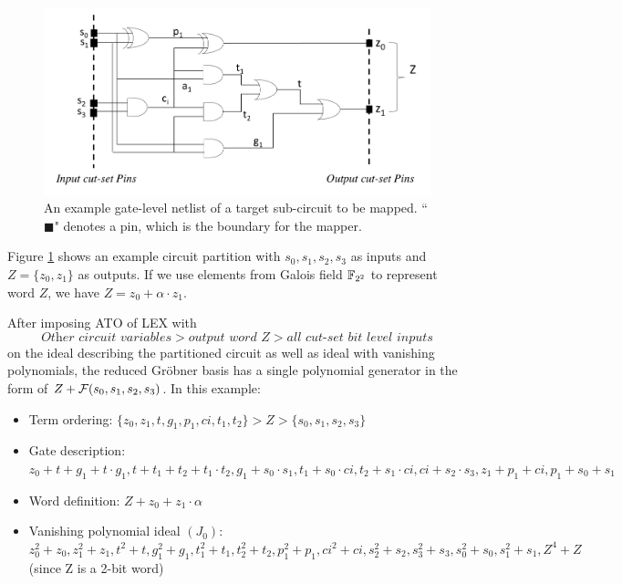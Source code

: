 \begin{figure}[tbp]
	\begin{center}
	\includegraphics[width=\textwidth]{newfig/tobemapped.pdf}
	\end{center}
	\caption{An example gate-level netlist of a target sub-circuit to be mapped. ``$\blacksquare$" denotes a pin, 
	which is the boundary for the mapper.}
	\label{fig:tobemapped}
\end{figure}

Figure \ref{fig:tobemapped} shows an example circuit partition with $s_0,s_1,s_2,s_3$ as inputs and
$Z = \{z_0,z_1\}$ as outputs. If we use elements from Galois field ${\mathbb{F}}_{2^2}$ to represent word $Z$,
we have $Z = z_0 + \alpha\cdot z_1$.

After imposing ATO of LEX with
$$\textit{Other\ circuit\ variables} > \textit{output\ word\ } Z > \textit{all\ cut-set\ bit\ level\ inputs}$$
on the ideal describing the partitioned circuit as well as ideal with vanishing polynomials,
the reduced Gr\"obner basis has a single polynomial generator in the form of $Z + {\mathcal{F}}(s_0,s_1,s_2,s_3)$.
In this example:

\begin{itemize}
\item Term ordering: $\{z_0,z_1,t,g_1,p_1,ci,t_1,t_2\}>Z>\{s_0,s_1,s_2,s_3\}$
\item Gate description: $z_0+t+g_1+t\cdot g_1, t+t_1+t_2+t_1\cdot t_2, g_1+s_0\cdot s_1,
			t_1+s_0\cdot ci, t_2+s_1\cdot ci, ci+s_2\cdot s_3, z_1+p_1+ci, p_1+s_0+s_1$
\item Word definition: $Z+z_0+z_1\cdot \alpha$
\item Vanishing polynomial ideal $(J_0)$: $z_0^2+z_0, z_1^2+z_1, t^2+t, g_1^2+g_1, t_1^2+t_1, t_2^2+t_2, p_1^2+p_1, ci^2+ci,
			s_2^2+s_2, s_3^2+s_3, s_0^2+s_0, s_1^2+s_1, Z^4+Z$ (since Z is a 2-bit word)
\end{itemize}

